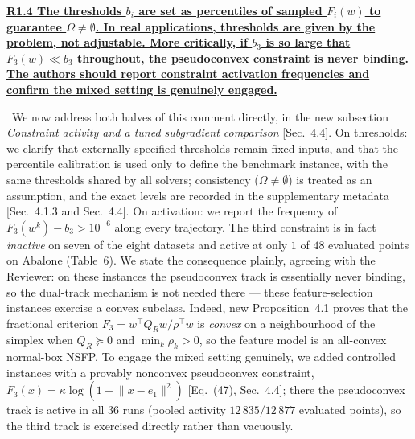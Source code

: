 \documentclass[11pt]{article}
\newcommand{\response}[1]{\smallskip\noindent{\color{blue!60!black}\textbf{Response.}}\ #1\par\medskip}
\newcommand{\loc}[1]{\textcolor{blue!50!black}{[#1]}}
\newenvironment{point}[1]{\medskip\noindent\textbf{\uline{#1}}\par}{\par}
\begin{document}
\begin{point}{R1.4 The thresholds $b_i$ are set as percentiles of sampled $F_i(w)$ to
guarantee $\Omega\neq\emptyset$. In real applications, thresholds are given by the problem,
not adjustable. More critically, if $b_3$ is so large that $F_3(w)\ll b_3$ throughout, the
pseudoconvex constraint is never binding. The authors should report constraint activation
frequencies and confirm the mixed setting is genuinely engaged.}
\response{We now address both halves of this comment directly, in the new subsection
\emph{Constraint activity and a tuned subgradient comparison} \loc{Sec.~4.4}. On
thresholds: we clarify that externally specified thresholds remain fixed inputs, and that
the percentile calibration is used only to define the benchmark instance, with the same
thresholds shared by all solvers; consistency ($\Omega\neq\emptyset$) is treated as an
assumption, and the exact levels are recorded in the supplementary metadata
\loc{Sec.~4.1.3 and Sec.~4.4}. On activation: we report the frequency of
$F_3(w^k)-b_3>10^{-6}$ along every trajectory. The third constraint is in fact
\emph{inactive} on seven of the eight datasets and active at only $1$ of $48$ evaluated
points on Abalone (Table~6). We state the consequence plainly, agreeing with the
Reviewer: on these instances the pseudoconvex track is essentially never binding, so the
dual-track mechanism is not needed there --- these feature-selection instances exercise a
convex subclass. Indeed, new Proposition~4.1 proves that the
fractional criterion $F_3=w^{\top}Q_Rw/\rho^{\top}w$ is \emph{convex} on a neighbourhood
of the simplex when $Q_R\succeq0$ and $\min_k\rho_k>0$, so the feature model is an
all-convex normal-box NSFP. To engage the mixed setting genuinely, we added controlled
instances with a provably nonconvex pseudoconvex constraint,
$F_3(x)=\kappa\log(1+\lVert x-e_1\rVert^2)$ \loc{Eq.~(47), Sec.~4.4}; there the
pseudoconvex track is active in all $36$ runs (pooled activity $12\,835/12\,877$ evaluated
points), so the third track is exercised directly rather than vacuously.}
\end{point}
\end{document}
